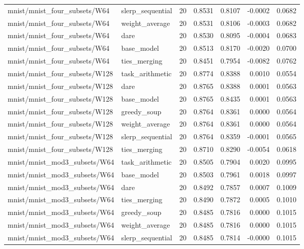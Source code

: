 \begin{tabular}{lllrrrr}
mnist/mnist\_four\_subsets/W64 & slerp\_sequential & 20 & 0.8531 & 0.8107 & -0.0002 & 0.0682 \\
mnist/mnist\_four\_subsets/W64 & weight\_average & 20 & 0.8531 & 0.8106 & -0.0003 & 0.0682 \\
mnist/mnist\_four\_subsets/W64 & dare & 20 & 0.8530 & 0.8095 & -0.0004 & 0.0683 \\
mnist/mnist\_four\_subsets/W64 & base\_model & 20 & 0.8513 & 0.8170 & -0.0020 & 0.0700 \\
mnist/mnist\_four\_subsets/W64 & ties\_merging & 20 & 0.8451 & 0.7954 & -0.0082 & 0.0762 \\
mnist/mnist\_four\_subsets/W128 & task\_arithmetic & 20 & 0.8774 & 0.8388 & 0.0010 & 0.0554 \\
mnist/mnist\_four\_subsets/W128 & dare & 20 & 0.8765 & 0.8388 & 0.0001 & 0.0563 \\
mnist/mnist\_four\_subsets/W128 & base\_model & 20 & 0.8765 & 0.8435 & 0.0001 & 0.0563 \\
mnist/mnist\_four\_subsets/W128 & greedy\_soup & 20 & 0.8764 & 0.8361 & 0.0000 & 0.0564 \\
mnist/mnist\_four\_subsets/W128 & weight\_average & 20 & 0.8764 & 0.8361 & 0.0000 & 0.0564 \\
mnist/mnist\_four\_subsets/W128 & slerp\_sequential & 20 & 0.8764 & 0.8359 & -0.0001 & 0.0565 \\
mnist/mnist\_four\_subsets/W128 & ties\_merging & 20 & 0.8710 & 0.8290 & -0.0054 & 0.0618 \\
mnist/mnist\_mod3\_subsets/W64 & task\_arithmetic & 20 & 0.8505 & 0.7904 & 0.0020 & 0.0995 \\
mnist/mnist\_mod3\_subsets/W64 & base\_model & 20 & 0.8503 & 0.7961 & 0.0018 & 0.0997 \\
mnist/mnist\_mod3\_subsets/W64 & dare & 20 & 0.8492 & 0.7857 & 0.0007 & 0.1009 \\
mnist/mnist\_mod3\_subsets/W64 & ties\_merging & 20 & 0.8490 & 0.7872 & 0.0005 & 0.1010 \\
mnist/mnist\_mod3\_subsets/W64 & greedy\_soup & 20 & 0.8485 & 0.7816 & 0.0000 & 0.1015 \\
mnist/mnist\_mod3\_subsets/W64 & weight\_average & 20 & 0.8485 & 0.7816 & 0.0000 & 0.1015 \\
mnist/mnist\_mod3\_subsets/W64 & slerp\_sequential & 20 & 0.8485 & 0.7814 & -0.0000 & 0.1015 \\
\bottomrule
\end{tabular}
